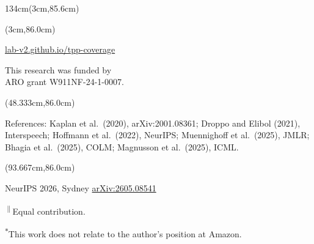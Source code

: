 \documentclass[final]{beamer}
\newcommand{\Sfive}{\fontsize{24}{28}\selectfont}
\newlength{\colw}\setlength{\colw}{43.333cm}
\begin{document}
\begin{frame}[t]
\begin{textblock*}{134cm}(3cm,85.6cm)\noindent{\color{darkblue}\rule{134cm}{0.2cm}}\end{textblock*}
\begin{textblock*}{\colw}(3cm,86.0cm)\parbox[t]{\colw}{\Sfive\raggedright\color{darkblue}
  \href{https://lab-v2.github.io/tpp-coverage/}{lab-v2.github.io/tpp-coverage}\par
  This research was funded by\\
  ARO grant W911NF-24-1-0007.\par}
\end{textblock*}
\begin{textblock*}{\colw}(48.333cm,86.0cm)\parbox[t]{\colw}{\Sfive\centering\color{darkblue}
  References: Kaplan et al.\ (2020), arXiv:2001.08361; Droppo and Elibol (2021),\\
  Interspeech; Hoffmann et al.\ (2022), NeurIPS; Muennighoff et al.\ (2025), JMLR;\\
  Bhagia et al.\ (2025), COLM; Magnusson et al.\ (2025), ICML.\par}
\end{textblock*}
\begin{textblock*}{\colw}(93.667cm,86.0cm)\parbox[t]{\colw}{\Sfive\raggedleft\color{darkblue}
  NeurIPS 2026, Sydney \quad \href{https://arxiv.org/abs/2605.08541}{arXiv:2605.08541}\par
  \textsuperscript{$\|$}Equal contribution.\par
  \textsuperscript{$*$}This work does not relate to the author's position at Amazon.\par}
\end{textblock*}
\end{frame}
\end{document}
